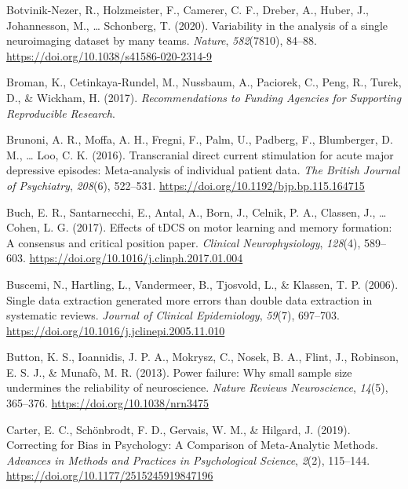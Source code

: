 \documentclass[
  man,floatsintext]{apa6}
\newlength{\cslhangindent}
\newlength{\cslentryspacingunit} %
\newenvironment{CSLReferences}[2] %
 {%
  \setlength{\parindent}{0pt}
  \ifodd #1
  \let\oldpar\par
  \def\par{\hangindent=\cslhangindent\oldpar}
  \fi
  \setlength{\parskip}{#2\cslentryspacingunit}
 }%
 {}
\begin{document}
\begin{CSLReferences}{1}{0}
\leavevmode{}%
Botvinik-Nezer, R., Holzmeister, F., Camerer, C. F., Dreber, A., Huber, J., Johannesson, M., \ldots{} Schonberg, T. (2020). Variability in the analysis of a single neuroimaging dataset by many teams. \emph{Nature}, \emph{582}(7810), 84--88. \url{https://doi.org/10.1038/s41586-020-2314-9}

\leavevmode{}%
Broman, K., Cetinkaya-Rundel, M., Nussbaum, A., Paciorek, C., Peng, R., Turek, D., \& Wickham, H. (2017). \emph{Recommendations to {Funding Agencies} for {Supporting Reproducible Research}}.

\leavevmode{}%
Brunoni, A. R., Moffa, A. H., Fregni, F., Palm, U., Padberg, F., Blumberger, D. M., \ldots{} Loo, C. K. (2016). Transcranial direct current stimulation for acute major depressive episodes: Meta-analysis of individual patient data. \emph{The British Journal of Psychiatry}, \emph{208}(6), 522--531. \url{https://doi.org/10.1192/bjp.bp.115.164715}

\leavevmode{}%
Buch, E. R., Santarnecchi, E., Antal, A., Born, J., Celnik, P. A., Classen, J., \ldots{} Cohen, L. G. (2017). Effects of {tDCS} on motor learning and memory formation: {A} consensus and critical position paper. \emph{Clinical Neurophysiology}, \emph{128}(4), 589--603. \url{https://doi.org/10.1016/j.clinph.2017.01.004}

\leavevmode{}%
Buscemi, N., Hartling, L., Vandermeer, B., Tjosvold, L., \& Klassen, T. P. (2006). Single data extraction generated more errors than double data extraction in systematic reviews. \emph{Journal of Clinical Epidemiology}, \emph{59}(7), 697--703. \url{https://doi.org/10.1016/j.jclinepi.2005.11.010}

\leavevmode{}%
Button, K. S., Ioannidis, J. P. A., Mokrysz, C., Nosek, B. A., Flint, J., Robinson, E. S. J., \& Munafò, M. R. (2013). Power failure: Why small sample size undermines the reliability of neuroscience. \emph{Nature Reviews Neuroscience}, \emph{14}(5), 365--376. \url{https://doi.org/10.1038/nrn3475}

\leavevmode{}%
Carter, E. C., Schönbrodt, F. D., Gervais, W. M., \& Hilgard, J. (2019). Correcting for {Bias} in {Psychology}: {A Comparison} of {Meta-Analytic Methods}. \emph{Advances in Methods and Practices in Psychological Science}, \emph{2}(2), 115--144. \url{https://doi.org/10.1177/2515245919847196}


\end{CSLReferences}
\end{document}
